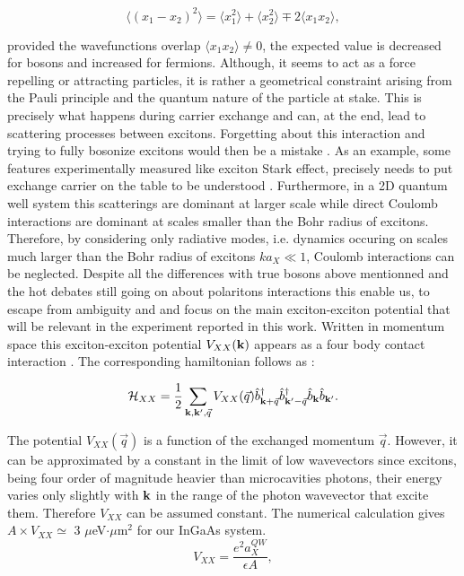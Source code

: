 \begin{equation}
    \langle(x_1-x_2)^2\rangle = \langle x_1^2\rangle + \langle x_2^2\rangle \mp 2\langle x_1x_2\rangle ,
\end{equation}

provided the wavefunctions overlap $\langle x_1x_2\rangle\neq0$, the expected value is decreased for bosons and increased for fermions. Although, it seems to act 
as a force repelling or attracting particles, it is rather a geometrical constraint arising from the Pauli principle and the quantum nature of the particle at stake.
This is precisely what happens during carrier exchange and can, at the end, lead to scattering processes between excitons. Forgetting about this interaction and trying to fully bosonize excitons would then be a mistake \cite{ciuti_carrier_exchanges_1998}.
As an example, some features experimentally measured like exciton Stark effect, precisely needs to put exchange carrier on the table to be understood \cite{exciton_stark_VonLehmen_86,exciton_stark_Mysyrowicz_86,joffre_m_subpicosecond_1987}.
Furthermore, in a 2D quantum well system this scatterings are dominant at larger scale while direct Coulomb interactions are dominant at scales smaller than the Bohr radius of
excitons. Therefore, by considering only radiative modes, i.e. dynamics occuring on scales much larger than the Bohr radius of
excitons $ka_X\ll 1$, Coulomb interactions can be neglected. Despite all the differences with true bosons above mentionned and the hot debates still going on about polaritons interactions \cite{Combescot_2007_exact_pol_pol_interactions,I_frerot_PRX_2023} this enable us, to escape from ambiguity and and focus on the main exciton-exciton potential that 
will be relevant in the experiment reported in this work. Written in momentum space this exciton-exciton potential $V_{XX}(\mathbf{k})$ appears as a four body contact interaction \cite{Rochat2000}. The corresponding hamiltonian follows as :


\begin{equation}
    \mathcal{H}_{XX} = \dfrac{1}{2}\sum_{\mathbf{k}, \mathbf{k}', \vec{q}} V_{XX}(\vec{q}) \hat{b}^\dagger_{\mathbf{k}+\vec{q}} \hat{b}^\dagger_{\mathbf{k}'-\vec{q}} \hat{b}_{\mathbf{k}} \hat{b}_{\mathbf{k}'}.
\label{exciton_interaction_ham}
\end{equation}

The potential $V_{XX}(\vec{q})$ is a function of the exchanged momentum $\vec{q}$. However, it can be approximated by a constant in the limit of low wavevectors since excitons, being four order of magnitude heavier than microcavities photons, their energy varies only slightly with $\mathbf{k}$ in the range of the photon wavevector that excite them. Therefore $V_{XX}$ can be assumed constant. The numerical calculation gives $A \times V_{XX}\simeq$ 3 $\mu$eV$\cdot \mu$m$^{2}$ for our InGaAs system.
\begin{equation}
    V_{XX} = \dfrac{e^2 a_X^{QW}}{\epsilon A},
\end{equation}

